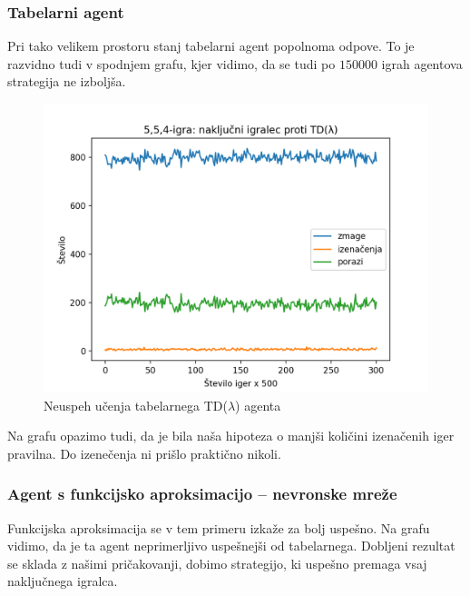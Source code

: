 \documentclass[12pt,a4paper]{amsart}
\theoremstyle{definition} %
\theoremstyle{plain} %
\begin{document}
\subsubsection{Tabelarni agent}
Pri tako velikem prostoru stanj tabelarni agent popolnoma odpove. To je razvidno tudi v spodnjem grafu, 
kjer vidimo, da se tudi po $150000$ igrah agentova strategija ne izboljša. 

\begin{figure}[H]
    \includegraphics[scale=0.725]{../rezultati/tdl-554-150000-2.png}
    \caption{Neuspeh učenja tabelarnega TD($\lambda$) agenta}
\end{figure}

Na grafu opazimo tudi, da je bila naša hipoteza o manjši količini izenačenih iger pravilna. Do izenečenja 
ni prišlo praktično nikoli.

\subsubsection{Agent s funkcijsko aproksimacijo -- nevronske mreže}
Funkcijska aproksimacija se v tem primeru izkaže za bolj uspešno. Na grafu vidimo, da je ta agent 
neprimerljivo uspešnejši od tabelarnega. Dobljeni rezultat se sklada z našimi pričakovanji, dobimo 
strategijo, ki uspešno premaga vsaj naključnega igralca.
\end{document}
